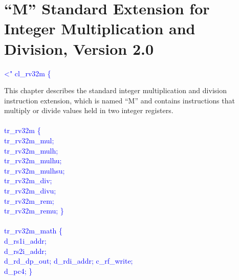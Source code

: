 \chapter{``M'' Standard Extension for Integer Multiplication and
  Division, Version 2.0}

\textcolor{blue}{
\textless" cl\_rv32m \{\\%
}

This chapter describes the standard integer multiplication and
division instruction extension, which is named ``M'' and contains
instructions that multiply or divide values held in two integer
registers.\\
\\
\textcolor{blue}{
\indent tr\_rv32m \{ \\%
\indent \hspace{\parindent} tr\_rv32m\_mul; \\%
\indent \hspace{\parindent} tr\_rv32m\_mulh; \\%
\indent \hspace{\parindent} tr\_rv32m\_mulhu; \\%
\indent \hspace{\parindent} tr\_rv32m\_mulhsu; \\%
\indent \hspace{\parindent} tr\_rv32m\_div; \\%
\indent \hspace{\parindent} tr\_rv32m\_divu; \\%
\indent \hspace{\parindent} tr\_rv32m\_rem; \\%
\indent \hspace{\parindent} tr\_rv32m\_remu; \} \\%
}
\\
\textcolor{blue}{
\indent tr\_rv32m\_math \{\\%
\indent \hspace{\parindent} d\_rs1i\_addr; \\%
\indent \hspace{\parindent} d\_rs2i\_addr; \\%
\indent \hspace{\parindent} d\_rd\_dp\_out; d\_rdi\_addr; c\_rf\_write;  \\%
\indent \hspace{\parindent} d\_pc4; \}\\%
}
